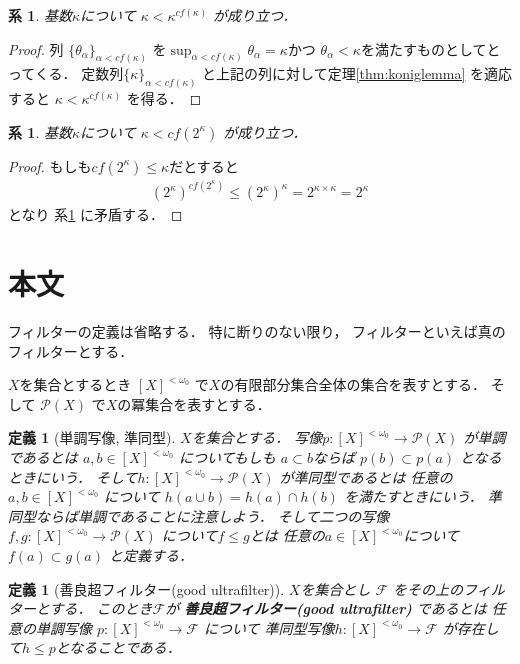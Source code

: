 \documentclass[leqno, a4paper, 12pt]{jsarticle}
\newtheorem{cor}[thm]{系}
\newtheorem{df}[thm]{定義}
\newcommand{\myfinset}[1]{[#1]^{<\omega_{0}}}
\newcommand{\myfil}[1]{\mathcal{#1}}
\newcommand{\mycf}[1]{cf(#1)}
\newcommand{\mypowset}[1]{\mathcal{P}(#1)}
\begin{document}
\begin{cor}\label{cor:cf}
基数$\kappa$について
$\kappa<\kappa^{\mycf{\kappa}}$
が成り立つ．
\end{cor}
\begin{proof}
列
$\{\theta_{\alpha}\}_{\alpha<\mycf{\kappa}}$
を$\sup_{\alpha<\mycf{\kappa}}\theta_{\alpha}=\kappa$かつ
$\theta_{\alpha}<\kappa$を満たすものとしてとってくる．
定数列$\{\kappa\}_{\alpha<\mycf{\kappa}}$
と上記の列に対して定理\ref{thm:koniglemma}
を適応すると
$\kappa<\kappa^{\mycf{\kappa}}$
を得る．
\end{proof}

\begin{cor}\label{cor:powercf}
基数$\kappa$について
$\kappa<\mycf{2^{\kappa}}$
が成り立つ．
\end{cor}
\begin{proof}
もしも$\mycf{2^{\kappa}}\le \kappa$だとすると
\begin{align*}
(2^{\kappa})^{\mycf{2^{\kappa}}}\le (2^{\kappa})^{\kappa}=2^{\kappa\times \kappa}=2^{\kappa}
\end{align*}
となり
系\ref{cor:cf}
に矛盾する．
\end{proof}


\section{本文}
フィルターの定義は省略する．
特に断りのない限り，
フィルターといえば真のフィルターとする．


$X$を集合とするとき
$\myfinset{X}$
で$X$の有限部分集合全体の集合を表すとする．
そして
$\mypowset{X}$
で$X$の冪集合を表すとする．
\begin{df}[単調写像, 準同型]
$X$を集合とする．
写像$p\colon \myfinset{X}\to \mypowset{X}$
が単調であるとは
$a, b\in \myfinset{X}$
についてもしも
$a\subset b$ならば
$p(b)\subset p(a)$
となるときにいう．
そして$h\colon \myfinset{X}\to \mypowset{X}$
が準同型であるとは
任意の$a, b\in \myfinset{X}$
について
$h(a\cup b)=h(a)\cap h(b)$
を満たすときにいう．
準同型ならば単調であることに注意しよう．
そして二つの写像
$f, g\colon \myfinset{X}\to \mypowset{X}$
について$f\le g$とは
任意の$a\in \myfinset{X}$について
$f(a)\subset g(a)$
と定義する．
\end{df}
\begin{df}[善良超フィルター(good ultrafilter)]
$X$を集合とし
$\myfil{F}$
をその上のフィルターとする．
このとき$\myfil{F}$が
\textbf{善良超フィルター(good ultrafilter)}
であるとは
任意の単調写像
$p\colon \myfinset{X}\to \myfil{F}$
について
準同型写像$h\colon \myfinset{X}\to \myfil{F}$
が存在して$h\le p$となることである．
\end{df}
\end{document}
